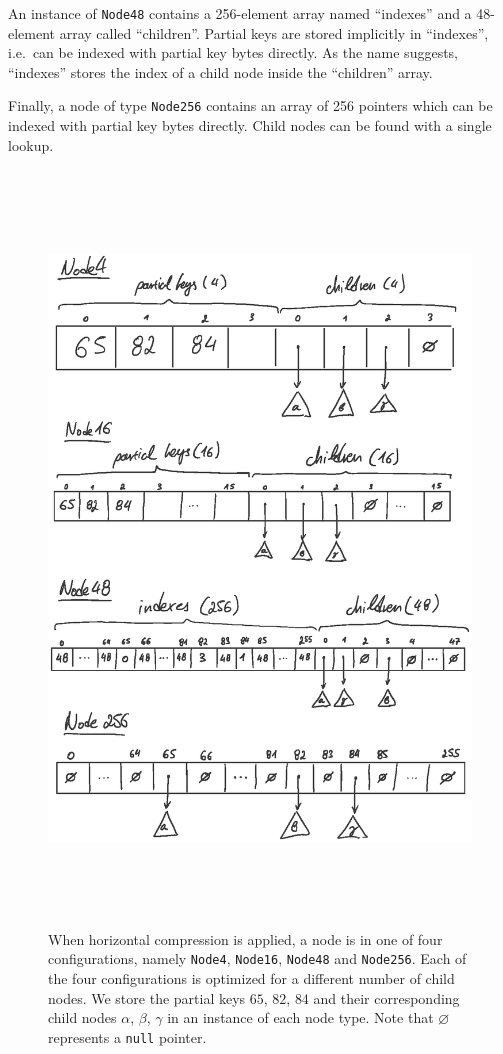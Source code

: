 \documentclass[abstracton,12pt]{scrartcl}
\theoremstyle{definition}
\begin{document}
An instance of \texttt{Node48} contains a 256-element array named 
``indexes'' and a 48-element array called ``children''.
Partial keys are stored implicitly in ``indexes'', i.e.\ 
can be indexed with partial key bytes directly.
As the name suggests, ``indexes'' stores the index of a child
node inside the ``children'' array.

Finally, a node of type \texttt{Node256} contains an array of
256 pointers which can be indexed with partial key bytes directly.
Child nodes can be found with a single lookup.

\begin{figure}[H]
  \centering
  \includegraphics[height=20cm,trim={2.5cm 5cm 2.5cm 3.5cm},clip]{art_nodes_draw}
  \caption{
    When horizontal compression is applied, a node is in one of four 
    configurations, namely \texttt{Node4}, \texttt{Node16}, \texttt{Node48} 
    and \texttt{Node256}.
    Each of the four configurations is optimized for a different number of 
    child nodes. We store the partial keys $65$, $82$, $84$ and their 
    corresponding child nodes $\alpha$, $\beta$, $\gamma$ in an instance
    of each node type. Note that $\varnothing$ represents a \texttt{null} 
    pointer.
  }
 \label{fig:horizontal-compression}
\end{figure}
\end{document}
